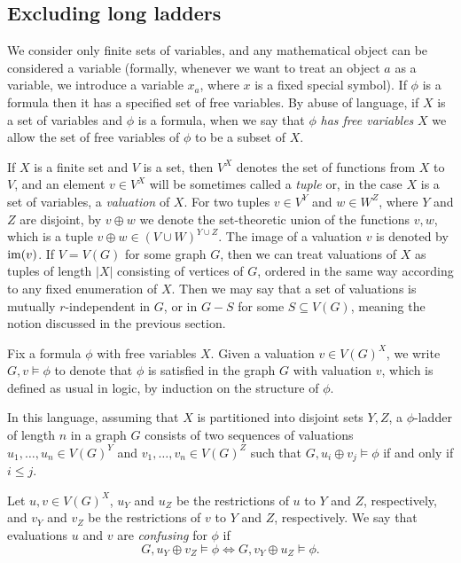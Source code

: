 \subsection{Excluding long ladders}
\label{sec:uqw-stable}


We consider only finite sets of variables, and any mathematical object can be considered a variable 
(formally, whenever we want to treat an object $a$ as a variable, we introduce a variable $x_a$, where $x$ is a fixed special symbol).
If $\phi$ is a formula then it has a specified set of free variables.
By abuse of language, if $X$ is a set of variables and $\phi$
is a formula, when we say that $\phi$ \emph{has free variables} $X$
we allow the set of free variables of $\phi$ to be a subset of $X$.

If $X$ is a finite set and $V$ is a set, then $V^X$ denotes the set of functions from $X$ to $V$, and an element $v\in V^X$ will be sometimes called a \emph{tuple} 
or, in the case $X$ is a set of variables, a \emph{valuation} of $X$.
For two tuples
$v\in V^Y$ and $w\in  W^Z$, where $Y$ and $Z$ are disjoint, by
$v\oplus w$ we denote the set-theoretic union of the functions $v,w$,
which is a tuple $v\oplus w\in (V\cup W)^{Y\cup Z}$.
The image of a valuation $v$ is denoted by $\mathrm{im}(v)$.
If $V=V(G)$ for some graph $G$, then we can treat valuations of $X$ as tuples of length $|X|$ consisting of vertices of $G$, ordered in the same way according to any fixed enumeration of $X$.
Then we may say that a set of valuations is mutually $r$-independent in $G$, or in $G-S$ for some $S\subseteq V(G)$, meaning the notion discussed in the previous section.


Fix a formula $\phi$ with free variables $X$.
Given a valuation $v\in V(G)^X$, we write $G,v\models \phi$ to denote that $\phi$ is satisfied 
in the graph $G$ with valuation $v$, which is defined as usual in logic, by induction on the structure of $\phi$.

In this language,
assuming that  $X$ is partitioned into disjoint sets $Y,Z$, a $\phi$-ladder of length $n$ in a graph $G$ consists of two sequences of valuations $u_1,\ldots,u_n\in V(G)^Y$
    and $v_1,\ldots,v_n\in V(G)^Z$
     such that $G,u_i\oplus v_j\models \phi$ if and only if $i\le j$.
    
    
    
		Let $u,v\in V(G)^X$, $u_Y$ and $u_Z$ be the restrictions of $u$ to $Y$ and $Z$, respectively,
and $v_Y$ and $v_Z$ be the restrictions of $v$ to $Y$ and $Z$, respectively.
		We say that evaluations $u$ and $v$ are \emph{confusing} for $\phi$
		if $$G,u_Y\oplus v_Z\models \phi\iff G,v_Y\oplus u_Z\models \phi.$$
		



